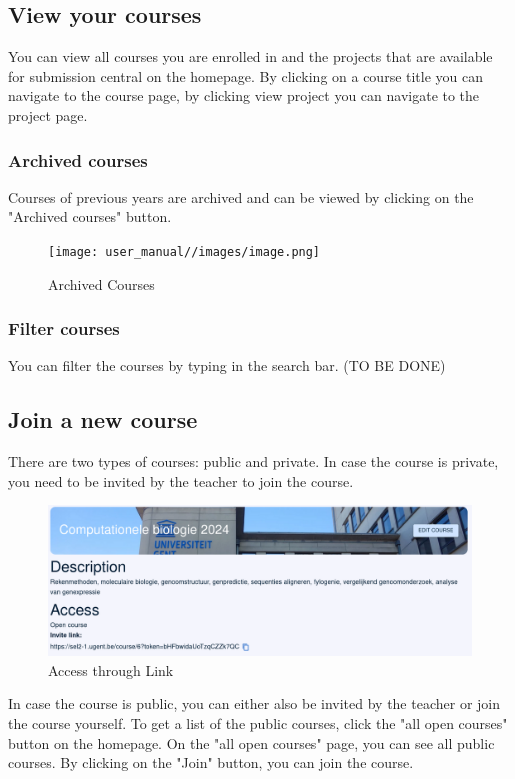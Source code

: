 \documentclass{article}
\begin{document}
\subsection{View your courses}

You can view all courses you are enrolled in and the projects that are available for submission central on the homepage. By clicking on a course title you can navigate to the course page, by clicking view project you can navigate to the project page.

\subsubsection{Archived courses}
Courses of previous years are archived and can be viewed by clicking on the "Archived courses" button.

\begin{figure}[H]
    \centering
    \texttt{[image: user\_manual//images/image.png]}
    \caption{Archived Courses}
    \label{fig:archived_courses}
\end{figure}

\subsubsection{Filter courses}
You can filter the courses by typing in the search bar. (TO BE DONE)

\subsection{Join a new course}
There are two types of courses: public and private.
In case the course is private, you need to be invited by the teacher to join the course.

\begin{figure}[H]
    \centering
    \includegraphics[width=0.5\linewidth]{user_manual//images/Access_private.png}
    \caption{Access through Link}
    \label{fig:access_private}
\end{figure}

In case the course is public, you can either also be invited by the teacher or join the course yourself. 
To get a list of the public courses, click the "all open courses" button on the homepage.
On the "all open courses" page, you can see all public courses. By clicking on the "Join" button, you can join the course.
\end{document}
